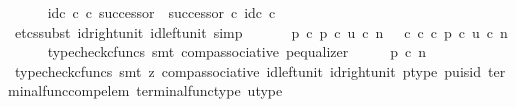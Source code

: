 \begin{isabellebody}
\ \ \ \ \isamarkupfalse%
\ {\isachardoublequoteopen}id\isactrlsub c\ {\isasymnat}\isactrlsub c\ {\isasymcirc}\isactrlsub c\ successor\ {\isacharequal}{\kern0pt}\ successor\ {\isasymcirc}\isactrlsub c\ id\isactrlsub c\ {\isasymnat}\isactrlsub c{\isachardoublequoteclose}\isanewline
\ \ \ \ \ \ \isamarkupfalse%
\ {\isacharparenleft}{\kern0pt}etcs{\isacharunderscore}{\kern0pt}subst\ id{\isacharunderscore}{\kern0pt}right{\isacharunderscore}{\kern0pt}unit{}\ id{\isacharunderscore}{\kern0pt}left{\isacharunderscore}{\kern0pt}unit{}{\isacharcomma}{\kern0pt}\ simp{\isacharparenright}{\kern0pt}\isanewline
\ \ \isamarkupfalse%
\isanewline
\isanewline
\ \ \isamarkupfalse%
\ {\isachardoublequoteopen}p\ {\isasymcirc}\isactrlsub c\ p{\isacharprime}{\kern0pt}\ {\isasymcirc}\isactrlsub c\ u\ {\isasymcirc}\isactrlsub c\ n\ {\isacharequal}{\kern0pt}\ {\isacharparenleft}{\kern0pt}{\isasymt}\ {\isasymcirc}\isactrlsub c\ {\isasymbeta}\isactrlbsub {\isasymnat}\isactrlsub c\isactrlesub {\isacharparenright}{\kern0pt}\ {\isasymcirc}\isactrlsub c\ p{\isacharprime}{\kern0pt}\ {\isasymcirc}\isactrlsub c\ u\ {\isasymcirc}\isactrlsub c\ n{\isachardoublequoteclose}\isanewline
\ \ \ \ \isamarkupfalse%
\ {\isacharparenleft}{\kern0pt}typecheck{\isacharunderscore}{\kern0pt}cfuncs{\isacharcomma}{\kern0pt}\ smt\ comp{\isacharunderscore}{\kern0pt}associative{}\ p{\isacharprime}{\kern0pt}{\isacharunderscore}{\kern0pt}equalizer{\isacharparenright}{\kern0pt}\isanewline
\ \ \isamarkupfalse%
\ \isamarkupfalse%
\ {\isachardoublequoteopen}p\ {\isasymcirc}\isactrlsub c\ n\ {\isacharequal}{\kern0pt}\ {\isasymt}{\isachardoublequoteclose}\isanewline
\ \ \ \ \isamarkupfalse%
\ {\isacharparenleft}{\kern0pt}typecheck{\isacharunderscore}{\kern0pt}cfuncs{\isacharcomma}{\kern0pt}\ smt\ {\isacharparenleft}{\kern0pt}z{}{\isacharparenright}{\kern0pt}\ comp{\isacharunderscore}{\kern0pt}associative{}\ id{\isacharunderscore}{\kern0pt}left{\isacharunderscore}{\kern0pt}unit{}\ id{\isacharunderscore}{\kern0pt}right{\isacharunderscore}{\kern0pt}unit{}\ p{\isacharprime}{\kern0pt}{\isacharunderscore}{\kern0pt}type\ p{\isacharprime}{\kern0pt}{\isacharunderscore}{\kern0pt}u{\isacharunderscore}{\kern0pt}is{\isacharunderscore}{\kern0pt}id\ terminal{\isacharunderscore}{\kern0pt}func{\isacharunderscore}{\kern0pt}comp{\isacharunderscore}{\kern0pt}elem\ terminal{\isacharunderscore}{\kern0pt}func{\isacharunderscore}{\kern0pt}type\ u{\isacharunderscore}{\kern0pt}type{\isacharparenright}{\kern0pt}\isanewline

\end{isabellebody}
